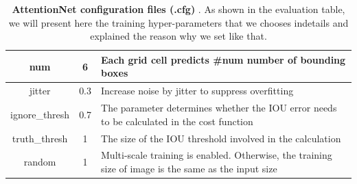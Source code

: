 \begin{table}[b]
{\begin{tabular}{@{}ccl@{}}
\multicolumn{1}{|c|}{num}            & \multicolumn{1}{c|}{6}                                                                               & \multicolumn{1}{l|}{Each grid cell predicts \#num number of bounding boxes}                                                                                                                                                                                                                                                                                                                            \\ \midrule
\multicolumn{1}{|c|}{jitter}         & \multicolumn{1}{c|}{0.3}                                                                             & \multicolumn{1}{l|}{Increase noise by jitter to suppress overfitting}                                                                                                                                                                                                                                                                                                                                  \\ \midrule
\multicolumn{1}{|c|}{ignore\_thresh} & \multicolumn{1}{c|}{0.7}                                                                             & \multicolumn{1}{l|}{The parameter determines whether the IOU error needs to be calculated  in the cost function}                                                                                                                                                                                                                                                                                       \\ \midrule
\multicolumn{1}{|c|}{truth\_thresh}  & \multicolumn{1}{c|}{1}                                                                               & \multicolumn{1}{l|}{The size of the IOU threshold involved in the calculation}                                                                                                                                                                                                                                                                                                                         \\ \midrule
\multicolumn{1}{|c|}{random}         & \multicolumn{1}{c|}{1}                                                                               & \multicolumn{1}{l|}{Multi-scale training is enabled. Otherwise, the training size of image is the same as the input size}                                                                                                                                                                                                                                                                              \\ \bottomrule
\end{tabular}}
\caption{ \textbf{AttentionNet configuration files (.cfg) }. As shown in the evaluation table, we will present here the training hyper-parameters that we chooses indetails and explained the reason why we set like that.}
\end{table}


